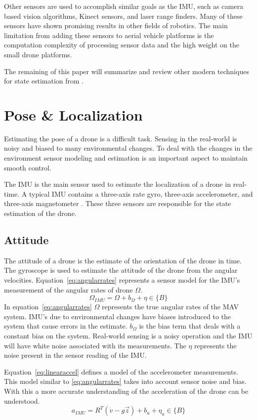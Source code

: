 \documentclass[conference]{IEEEtran}
\begin{document}
Other sensors are used to accomplish similar goals as the IMU, such as camera based vision algorithms, Kinect sensors, and laser range finders. Many of these sensors have shown promising results in other fields of robotics. The main limitation from adding these sensors to aerial vehicle platforms is the computation complexity of processing sensor data and the high weight on the small drone platforms.

The remaining of this paper will summarize and review other modern techniques for state estimation from \cite{6289431}.

\section{Pose \& Localization}
Estimating the pose of a drone is a difficult task. Sensing in the real-world is noisy and biased to many environmental changes. To deal with the changes in the environment sensor modeling and estimation is an important aspect to maintain smooth control.

The IMU is the main sensor used to estimate the localization of a drone in real-time. A typical IMU contains a three-axis rate gyro, three-axis accelerometer, and three-axis magnetometer \cite{6289431}. These three sensors are responsible for the state estimation of the drone.

\subsection{Attitude}
The attitude of a drone is the estimate of the orientation of the drone in time. The gyroscope is used to estimate the attitude of the drone from the angular velocities. Equation~\ref{eq:angularrates} represents a sensor model for the IMU's measurement of the angular rates of drone $\Omega$.
\begin{equation}
\label{eq:angularrates}
\Omega_{IMU} = \Omega + b_\Omega + \eta \in \{B\}
\end{equation}
In equation~\ref{eq:angularrates} $\Omega$ represents the true angular rates of the MAV system. IMU's due to environmental changes have biases introduced to the system that cause errors in the estimate. $b_\Omega$ is the bias term that deals with a constant bias on the system. Real-world sensing is a noisy operation and the IMU will have white noise associated with its measurements. The $\eta$ represents the noise present in the sensor reading of the IMU.

Equation~\ref{eq:linearaccel} defines a model of the accelerometer measurements. This model similar to \ref{eq:angularrates} takes into account sensor noise and bias. With this a more accurate understanding of the acceleration of the drone can be understood.
\begin{equation}
\label{eq:linearaccel}
a_{IMU} = R^T(\dot{v} - g\vec{z}) + b_a + \eta_a \in \{B\}
\end{equation}
\end{document}
